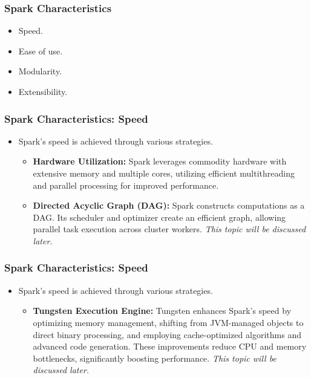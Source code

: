 \begin{frame}
    \frametitle{Spark Characteristics}
    \begin{itemize}
        \item Speed.
        \item Ease of use.
        \item Modularity.
        \item Extensibility.
    \end{itemize}
\end{frame}


\begin{frame}
    \frametitle{Spark Characteristics: Speed}
    \begin{itemize}
        \item Spark's speed is achieved through various strategies.
        \begin{itemize}
            \item \textbf{Hardware Utilization:} Spark leverages commodity hardware with extensive memory and multiple cores, utilizing efficient multithreading and parallel processing for improved performance.
            \item \textbf{Directed Acyclic Graph (DAG):} Spark constructs computations as a DAG. Its scheduler and optimizer create an efficient graph, allowing parallel task execution across cluster workers. \textit{\color{blue}This topic will be discussed later.}
        \end{itemize}
    \end{itemize}

\end{frame}

\begin{frame}
    \frametitle{Spark Characteristics: Speed}
    \begin{itemize}
        \item Spark's speed is achieved through various strategies.
        \begin{itemize}
            \item \textbf{Tungsten Execution Engine:} Tungsten enhances Spark's speed by optimizing memory management,
            shifting from JVM-managed objects to direct binary processing, and employing cache-optimized algorithms and advanced code generation. These improvements reduce CPU and memory bottlenecks, significantly boosting performance. \textit{\color{blue}This topic will be discussed later.}
        \end{itemize}
    \end{itemize}

\end{frame}

